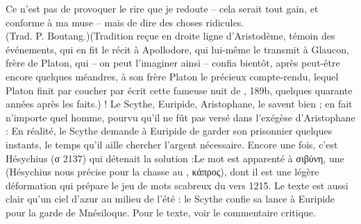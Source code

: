 {{{Ce n'est pas de provoquer le rire que je redoute -- cela serait tout gain, et conforme à ma muse -- mais de dire des choses ridicules.\\
(Trad. P. Boutang.)}(Tradition reçue en droite ligne d'Aristodème, témoin des événements, qui en fit le récit à Apollodore, qui lui-même le transmit à Glaucon, frère de Platon, qui -- on peut l'imaginer ainsi -- confia bientôt, après peut-être encore quelques méandres, à son frère Platon le précieux compte-rendu, lequel Platon finit par coucher par écrit cette fameuse nuit de , 189b, quelques quarante années après les faits.)} ! Le Scythe, Euripide, Aristophane, le savent bien ; en fait n'importe quel homme, pourvu qu'il ne fût pas versé dans l'exégèse d'Aristophane : En réalité, le Scythe demande à Euripide de garder son prisonnier quelques instants, le temps qu'il aille chercher l'argent nécessaire.
Encore une fois, c'est Hésychius (σ 2137) qui détenait la solution :Le mot est apparenté à σιβύνη, une  (Hésychius nous précise pour la chasse au , κάπρος), dont il est une légère déformation qui prépare le jeu de mots scabreux du vers 1215.
Le texte est aussi clair qu'un ciel d'azur au milieu de l'été : le Scythe confie sa lance à Euripide pour la garde de Mnésiloque.
Pour le texte, voir le commentaire critique.\\
}
